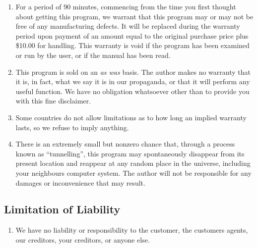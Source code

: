 \begin{enumerate}
\item For a period of 90 minutes, commencing from the time you first thought
     about getting this program, we warrant that this program may or may not be
     free of any manufacturing defects.  It will be replaced during the
     warranty period upon payment of an amount equal to the original purchase
     price plus \$10.00 for handling.  This warranty is void if the program has
     been examined or run by the user, or if the manual has been read.

\item This program is sold on an {\em as was} basis.  The author makes no warranty
     that it is, in fact, what we say it is in our propaganda, or that it will
     perform any useful function.  We have no obligation whatsoever other than
     to provide you with this fine disclaimer.

\item Some countries do not allow limitations as to how long an implied warranty
     lasts, so we refuse to imply anything.

\item There is an extremely small but nonzero chance that, through a process
     known as ``tunnelling'', this program may spontaneously disappear from its
     present location and reappear at any random place in the universe,
     including your neighbours computer system.  The author will not be
     responsible for any damages or inconvenience that may result.
\end{enumerate}

\subsection{Limitation of Liability}

\begin{enumerate}
\item We have no liability or responsibility to the customer, the customers
     agents, our creditors, your creditors, or anyone else. 
\end{enumerate}

%
